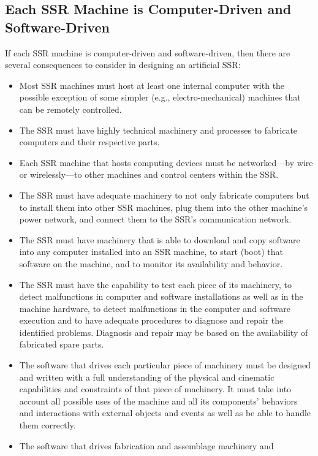 \subsection[Each SSR Machine is Computer{}-Driven and
Software{}-Driven]{Each SSR Machine is Computer-Driven and
Software-Driven}

If each SSR machine is computer-driven and software-driven, then there are several consequences to consider in designing an artificial SSR:

\begin{itemize}
\item Most SSR machines must host at least one internal computer with
the possible exception of some simpler (e.g., electro-mechanical) machines
that can be remotely controlled.
\item The SSR must have highly technical machinery and processes 
to fabricate computers and their respective parts.
\item Each SSR machine that hosts computing devices must be networked---by
wire or wirelessly---to other machines and control centers
within the SSR.
\item The SSR must have adequate machinery to not only
fabricate computers but to install them into other SSR machines,
plug them into the other machine's power network, and connect them to
the SSR's communication network.
\item The SSR must have machinery that is able to download and copy
software into any computer installed into an SSR machine, to start
(boot) that software on the machine, and to monitor its availability
and behavior.
\item The SSR must have the capability to test each piece of its machinery, to
detect malfunctions in computer and software installations as
well as in the machine hardware, to detect malfunctions in the computer
and software execution and to have adequate procedures to diagnose and
repair the identified problems.  Diagnosis and repair may be based on the availability of
fabricated spare parts.
\item The software that drives each particular piece of machinery must be
designed and written with a full understanding of the physical and
cinematic capabilities and constraints of that piece of machinery.
It must take into account all possible uses of the machine and all
its components' behaviors and interactions with external objects and
events as well as be able to handle them correctly.
\item The software that drives fabrication and assemblage machinery and

\end{itemize}
